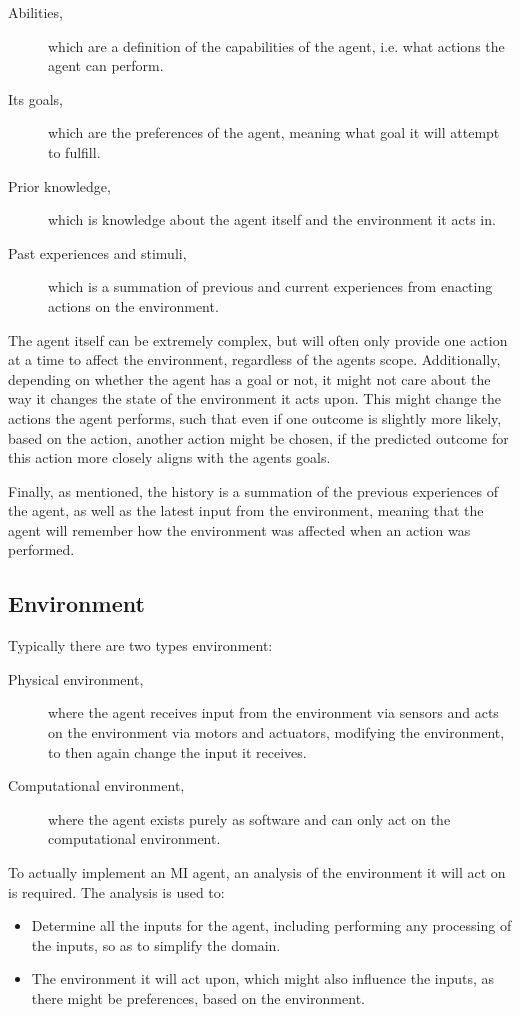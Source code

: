 \begin{description}
    \item[Abilities,]which are a definition of the capabilities of the agent, i{.}e{.} what actions the agent can perform.
    \item[Its goals,]which are the preferences of the agent, meaning what goal it will attempt to fulfill.
    \item[Prior knowledge,]which is knowledge about the agent itself and the environment it acts in.
    \item[Past experiences and stimuli,]which is a summation of previous and current experiences from enacting actions on the environment.   
\end{description}
The agent itself can be extremely complex, but will often only provide one action at a time to affect the environment, regardless of the agents scope.
Additionally, depending on whether the agent has a goal or not, it might not care about the way it changes the state of the environment it acts upon.
This might change the actions the agent performs, such that even if one outcome is slightly more likely, based on the action, another action might be chosen, if the predicted outcome for this action more closely aligns with the agents goals.


Finally, as mentioned, the history is a summation of the previous experiences of the agent, as well as the latest input from the environment, meaning that the agent will remember how the environment was affected when an action was performed.

\subsection{Environment}
Typically there are two types environment:
\begin{description}
    \item[Physical environment,]where the agent receives input from the environment via sensors and acts on the environment via motors and actuators, modifying the environment, to then again change the input it receives.
    \item[Computational environment,]where the agent exists purely as software and can only act on the computational environment.
\end{description}
To actually implement an MI agent, an analysis of the environment it will act on is required.
The analysis is used to:
\begin{itemize}
    \item Determine all the inputs for the agent, including performing any processing of the inputs, so as to simplify the domain.
    \item The environment it will act upon, which might also influence the inputs, as there might be preferences, based on the environment.
\end{itemize}

